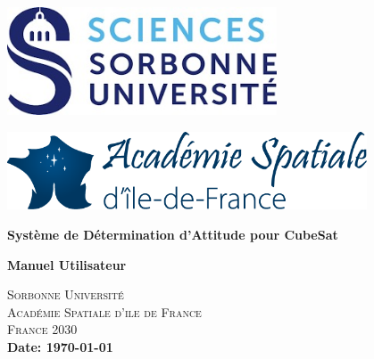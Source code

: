 \documentclass[a4paper,12pt]{article}
\begin{document}
\begin{titlepage}
    \vspace*{\fill}  %
    \centering

    \begin{minipage}{0.45\textwidth}
        \centering
        \includegraphics[width=0.6\textwidth]{fig/SU.jpg}
    \end{minipage}%
    \hfill
    \begin{minipage}{0.45\textwidth}
        \centering
        \includegraphics[width=0.8\textwidth]{fig/Academie_Spatiale.png}
    \end{minipage}

    \vspace{5cm}

    {\bfseries\Huge Système de Détermination d’Attitude pour CubeSat\par}
\vspace{1cm}
    {\bfseries\Huge Manuel Utilisateur\par}
        \vspace{3cm}
    \textsc{\LARGE Sorbonne Université}\\[1cm]
    \textsc{\Large Académie Spatiale d'ile de France }\\[1cm]
    \textsc{\Large France 2030 }\\[1cm]
    \vspace{3cm}
    \textbf{Date: \today}

    \vspace*{\fill}  %
\end{titlepage}
 \vspace*{\fill}
\begin{abstract}

Ce projet s’inscrit dans le contexte de l’Académie spatiale d’Île-de-France, projet financé par France 2030 visant à rattraper le retard de la France sur l’industrie.  L’Académie Spatiale d’Île-de-France a pour objectif de faire découvrir le spatial à la jeunesse française et à la communauté étudiante et de former les étudiants aux défis présents et futurs de l’industrie aérospatiale française.

 \vspace*{\fill}
\end{abstract}
\end{document}
